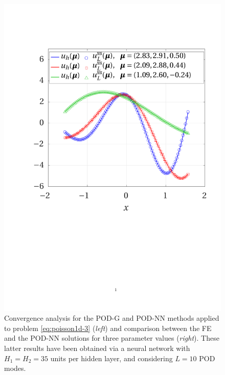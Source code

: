 \documentclass[12pt, a4paper, twoside, openright, notitlepage]{report}
\numberwithin{equation}{chapter}
\theoremstyle{theorem}
\theoremstyle{definition}
\theoremstyle{remark}
\theoremstyle{proposition}
\numberwithin{figure}{chapter}
\begin{document}
\begin{figure}[H]
			\includegraphics[scale = 0.4, trim = {1.5cm 9cm 1.5cm 3cm}, clip]{poisson1d_3_fe_vs_podnn}
			
			\vspace*{-0.2cm}
			
			\caption{Convergence analysis for the POD-G and POD-NN methods applied to problem \eqref{eq:poisson1d-3} (\emph{left}) and comparison between the FE and the POD-NN solutions for three parameter values (\emph{right}). These latter results have been obtained via a neural network with $H_1 = H_2 = 35$ units per hidden layer, and considering $L = 10$ POD modes.}
			\label{fig:poisson1d-3-fig2}
		\end{figure}
		
\end{document}

